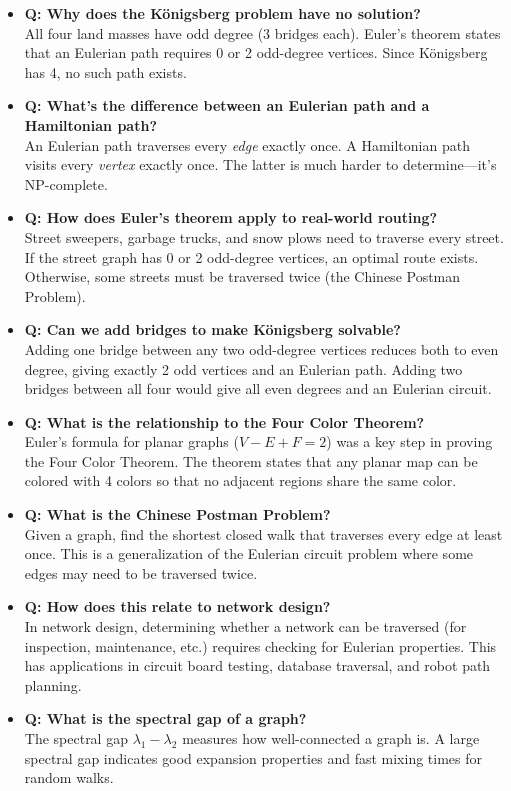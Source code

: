\begin{itemize}
\item \textbf{Q: Why does the K\"{o}nigsberg problem have no solution?} \\
All four land masses have odd degree (3 bridges each). Euler's theorem states that an Eulerian path requires 0 or 2 odd-degree vertices. Since K\"{o}nigsberg has 4, no such path exists.

\item \textbf{Q: What's the difference between an Eulerian path and a Hamiltonian path?} \\
An Eulerian path traverses every \emph{edge} exactly once. A Hamiltonian path visits every \emph{vertex} exactly once. The latter is much harder to determine---it's NP-complete.

\item \textbf{Q: How does Euler's theorem apply to real-world routing?} \\
Street sweepers, garbage trucks, and snow plows need to traverse every street. If the street graph has 0 or 2 odd-degree vertices, an optimal route exists. Otherwise, some streets must be traversed twice (the Chinese Postman Problem).

\item \textbf{Q: Can we add bridges to make K\"{o}nigsberg solvable?} \\
Adding one bridge between any two odd-degree vertices reduces both to even degree, giving exactly 2 odd vertices and an Eulerian path. Adding two bridges between all four would give all even degrees and an Eulerian circuit.

\item \textbf{Q: What is the relationship to the Four Color Theorem?} \\
Euler's formula for planar graphs ($V - E + F = 2$) was a key step in proving the Four Color Theorem. The theorem states that any planar map can be colored with 4 colors so that no adjacent regions share the same color.

\item \textbf{Q: What is the Chinese Postman Problem?} \\
Given a graph, find the shortest closed walk that traverses every edge at least once. This is a generalization of the Eulerian circuit problem where some edges may need to be traversed twice.

\item \textbf{Q: How does this relate to network design?} \\
In network design, determining whether a network can be traversed (for inspection, maintenance, etc.) requires checking for Eulerian properties. This has applications in circuit board testing, database traversal, and robot path planning.

\item \textbf{Q: What is the spectral gap of a graph?} \\
The spectral gap $\lambda_1 - \lambda_2$ measures how well-connected a graph is. A large spectral gap indicates good expansion properties and fast mixing times for random walks.
\end{itemize}

